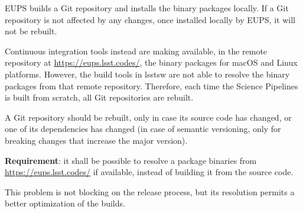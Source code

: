 EUPS builds a Git repository and installs the binary packages locally. 
If a Git repository is not affected by any changes, once installed locally by EUPS, it will not be rebuilt.

Continuous integration tools instead are making available, in the remote repository at \url{https://eups.lsst.codes/}, the binary packages for macOS and Linux platforms.
However, the build tools in lsstsw are not able to resolve the binary packages from that remote repository.
Therefore, each time the Science Pipelines is built from scratch, all Git repositories are rebuilt.

A Git repository should be rebuilt, only in case its source code has changed, or one of its dependencies has changed (in case of semantic versioning, only for breaking changes that increase the major version).

\textbf{Requirement}: it shall be possible to resolve a package binaries from \url{https://eups.lsst.codes/} if available, instead of building it from the source code.

This problem is not blocking on the release process, but its resolution permits a better optimization of the builds.


